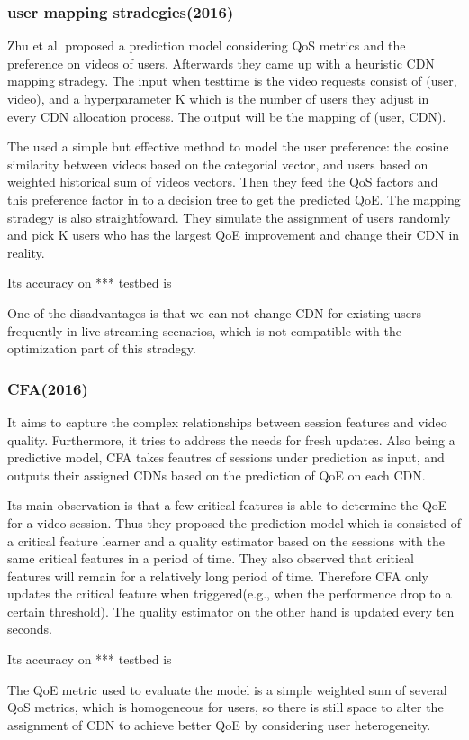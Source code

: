 \documentclass{ctexart}
\begin{document}
\subsubsection{user mapping stradegies(2016)\cite{DBLP:conf/globecom/ZhuMW016}}
\par Zhu et al. proposed a prediction model considering QoS metrics and the preference on videos of users. Afterwards they came up with a heuristic CDN mapping stradegy. The input when testtime is the video requests consist of (user, video), and a hyperparameter K which is the number of users they adjust in every CDN allocation process. The output will be the mapping of (user, CDN).
\par The used a simple but effective method to model the user preference: the cosine similarity between videos based on the categorial vector, and users based on weighted historical sum of videos vectors. Then they feed the QoS factors and this preference factor in to a decision tree to get the predicted QoE. The mapping stradegy is also straightfoward. They simulate the assignment of users randomly and pick K users who has the largest QoE improvement and change their CDN in reality.
\par Its accuracy on *** testbed is 
\par One of the disadvantages is that we can not change CDN for existing users frequently in live streaming scenarios, which is not compatible with the optimization part of this stradegy.
\subsubsection{CFA(2016)\cite{DBLP:conf/nsdi/JiangSMSS016}}
\par It aims to capture the complex relationships between session features and video quality. Furthermore, it tries to address the needs for fresh updates. Also being a predictive model, CFA takes feautres of sessions under prediction as input, and outputs their assigned CDNs based on the prediction of QoE on each CDN.
\par Its main observation is that a few critical features is able to determine the QoE for a video session. Thus they proposed the prediction model which is consisted of a critical feature learner and a quality estimator based on the sessions with the same critical features in a period of time. They also observed that critical features will remain for a relatively long period of time. Therefore CFA only updates the critical feature when triggered(e.g., when the performence drop to a certain threshold). The quality estimator on the other hand is updated every ten seconds.
\par Its accuracy on *** testbed is 
\par The QoE metric used to evaluate the model is a simple weighted sum of several QoS metrics, which is homogeneous for users, so there is still space to alter the assignment of CDN to achieve better QoE by considering user heterogeneity.
\end{document}
